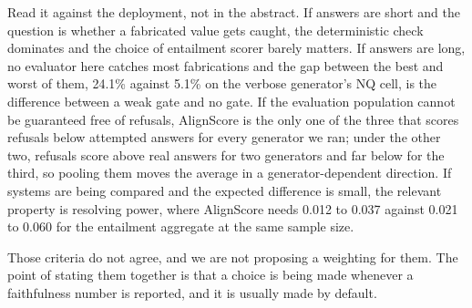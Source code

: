 \documentclass[11pt]{article}
\begin{document}
Read it against the deployment, not in the abstract. If answers are short and the question is whether a fabricated value gets caught, the deterministic check dominates and the choice of entailment scorer barely matters. If answers are long, no evaluator here catches most fabrications and the gap between the best and worst of them, 24.1\% against 5.1\% on the verbose generator's NQ cell, is the difference between a weak gate and no gate. If the evaluation population cannot be guaranteed free of refusals, AlignScore is the only one of the three that scores refusals below attempted answers for every generator we ran; under the other two, refusals score above real answers for two generators and far below for the third, so pooling them moves the average in a generator-dependent direction. If systems are being compared and the expected difference is small, the relevant property is resolving power, where AlignScore needs 0.012 to 0.037 against 0.021 to 0.060 for the entailment aggregate at the same sample size.

Those criteria do not agree, and we are not proposing a weighting for them. The point of stating them together is that a choice is being made whenever a faithfulness number is reported, and it is usually made by default.
\end{document}
